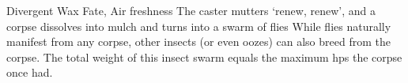  {Divergent}%
  {Wax}%
  {Fate, Air}%
  {freshness}%
  {The caster mutters `renew, renew', and a corpse dissolves into mulch and turns into a swarm of flies}%
  {%
  	While flies naturally manifest from any corpse, other insects (or even oozes) can also breed from the corpse.
	The total \gls{weight} of this insect swarm equals the maximum \glspl{hp} the corpse once had.
  }


